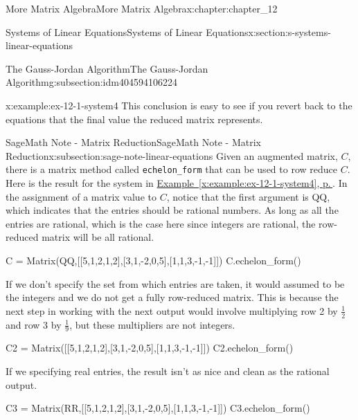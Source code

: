 \documentclass[twoside,10pt,]{book}
\newcommand{\xreffont}{\relax}
\newcommand{\mono}[1]{\texttt{#1}}
\numberwithin{equation}{section}
\begin{document}
\begin{chapterptx}{More Matrix Algebra}{}{More Matrix Algebra}{}{}{x:chapter:chapter_12}
\begin{sectionptx}{Systems of Linear Equations}{}{Systems of Linear Equations}{}{}{x:section:s-systems-linear-equations}
\begin{subsectionptx}{The Gauss-Jordan Algorithm}{}{The Gauss-Jordan Algorithm}{}{}{g:subsection:idm404594106224}
\begin{example}{}{x:example:ex-12-1-system4}
This conclusion is easy to see if you revert back to the equations that the final value the reduced matrix represents.%
\end{example}
\end{subsectionptx}
%
%
\typeout{************************************************}
\typeout{************************************************}
%
\begin{subsectionptx}{SageMath Note - Matrix Reduction}{}{SageMath Note - Matrix Reduction}{}{}{x:subsection:sage-note-linear-equations}
%
Given an augmented matrix, \(C\), there is a matrix method called \mono{echelon\_form} that can be used to row reduce \(C\). Here is the result for the system in \hyperref[x:example:ex-12-1-system4]{Example~{\xreffont\ref{x:example:ex-12-1-system4}}, p.\,\pageref{x:example:ex-12-1-system4}}.  In the assignment of a matrix value to \(C\), notice that the first argument is QQ, which indicates that the entries should be rational numbers.  As long as all the entries are rational, which is the case here since integers are rational, the row-reduced matrix will be all rational.%
\begin{sageinput}
C = Matrix(QQ,[[5,1,2,1,2],[3,1,-2,0,5],[1,1,3,-1,-1]])
C.echelon_form()
\end{sageinput}
\begin{sageoutput}
[1 	0 	0 	1/2 	1/2]
[0 	1 	0	-3/2 	3/2]
[0 	0 	1 	  0	-1]
\end{sageoutput}
If we don't specify the set from which entries are taken, it would assumed to be the integers and we do not get a fully row-reduced matrix. This is because the next step in working with the next output would involve multiplying row 2 by \(\frac{1}{2}\) and row 3 by \(\frac{1}{9}\), but these multipliers are not integers.%
\begin{sageinput}
C2 = Matrix([[5,1,2,1,2],[3,1,-2,0,5],[1,1,3,-1,-1]])
C2.echelon_form()
\end{sageinput}
\begin{sageoutput}
[ 1  1  3 -1 -1]
[ 0  2  2 -3  1]
[ 0  0  9  0 -9]
\end{sageoutput}
If we specifying real entries, the result isn't as nice and clean as the rational output.%
\begin{sageinput}
C3 = Matrix(RR,[[5,1,2,1,2],[3,1,-2,0,5],[1,1,3,-1,-1]])
C3.echelon_form()
\end{sageinput}
\begin{sageoutput}
[    1.000000    0.0000000    0.0000000    0.5000000    0.500000000000000]

\end{sageoutput}
\end{subsectionptx}
\end{sectionptx}
\end{chapterptx}
\end{document}
